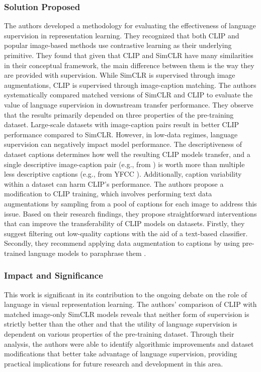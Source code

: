 \documentclass[11pt]{article}
\begin{document}
\subsubsection{Solution Proposed}
The authors developed a methodology for evaluating the effectiveness of language supervision in representation learning. They recognized that both CLIP and popular image-based methods use contrastive learning as their underlying primitive. They found that given that CLIP and SimCLR \cite{chen2020simple} have many similarities in their conceptual framework, the main difference between them is the way they are provided with supervision. While SimCLR is supervised through image augmentations, CLIP is supervised through image-caption matching. The authors systematically compared matched versions of SimCLR and CLIP to evaluate the value of language supervision in downstream transfer performance. They observe that the results primarily depended on three properties of the pre-training dataset. Large-scale datasets with image-caption pairs result in better CLIP performance compared to SimCLR. However, in low-data regimes, language supervision can negatively impact model performance. The descriptiveness \cite{kreiss2021concadia} of dataset captions determines how well the resulting CLIP models transfer, and a single descriptive image-caption pair (e.g., from \cite{Lin2014}) is worth more than multiple less descriptive captions (e.g., from YFCC \cite{Thomee_2016}). Additionally, caption variability within a dataset can harm CLIP's performance. The authors propose a modification to CLIP training, which involves performing text data augmentations by sampling from a pool of captions for each image to address this issue. Based on their research findings, they propose straightforward interventions that can improve the transferability of CLIP models on datasets. Firstly, they suggest filtering out low-quality captions with the aid of a text-based classifier. Secondly, they recommend applying data augmentation to captions by using pre-trained language models to paraphrase them \cite{wang2021gptj6b}.


\subsubsection{Impact and Significance}

This work is significant in its contribution to the ongoing debate on the role of language in visual representation learning. The authors' comparison of CLIP with matched image-only SimCLR models reveals that neither form of supervision is strictly better than the other and that the utility of language supervision is dependent on various properties of the pre-training dataset. Through their analysis, the authors were able to identify algorithmic improvements and dataset modifications that better take advantage of language supervision, providing practical implications for future research and development in this area.
\end{document}
